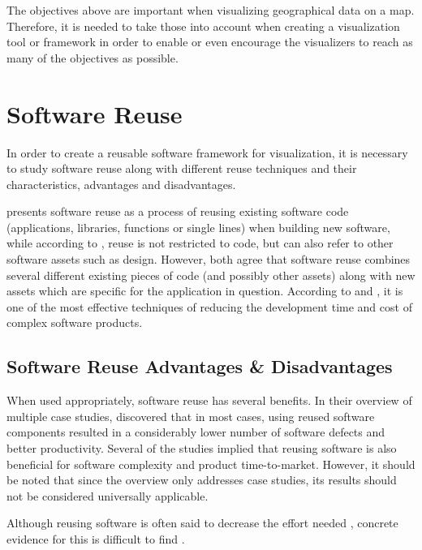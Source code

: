 The objectives above are important when visualizing geographical data on a map. Therefore, it is needed to take those into account when creating a visualization tool or framework in order to enable or even encourage the visualizers to reach as many of the objectives as possible.


\section{Software Reuse}

In order to create a reusable software framework for visualization, it is necessary to study software reuse along with different reuse techniques and their characteristics, advantages and disadvantages.

\citet{krueger_software_1992} presents software reuse as a process of reusing existing software code (applications, libraries, functions or single lines) when building new software, while according to \citet{mohagheghi_empirical_2008}, reuse is not restricted to code, but can also refer to other software assets such as design. However, both agree that software reuse combines several different existing pieces of code (and possibly other assets) along with new assets which are specific for the application in question. According to \citet{mcilroy_mass-produced_1969} and \citet{boehm_managing_1999}, it is one of the most effective techniques of reducing the development time and cost of complex software products.

\subsection{Software Reuse Advantages \& Disadvantages}

When used appropriately, software reuse has several benefits. In their overview of multiple case studies, \citet{mohagheghi_empirical_2008} discovered that in most cases, using reused software components resulted in a considerably lower number of software defects and better productivity. Several of the studies implied that reusing software is also beneficial for software complexity and product time-to-market. However, it should be noted that since the overview only addresses case studies, its results should not be considered universally applicable.

Although reusing software is often said to decrease the effort needed \citep{mcilroy_mass-produced_1969, boehm_managing_1999, mohagheghi_empirical_2008} , concrete evidence for this is difficult to find \citep{mohagheghi_empirical_2008}.

